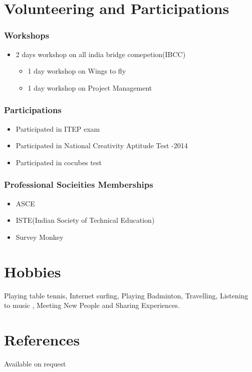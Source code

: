 \documentclass[a4paper,10pt]{article}
\begin{document}
\section{Volunteering and Participations}
\subsubsection{Workshops}
\begin{itemize}
\item 2 days workshop on all india bridge comepetion(IBCC)
\begin{itemize}
\item 1 day workshop on Wings to fly 
\item 1 day workshop on Project Management
\end{itemize}
\end{itemize}


\subsubsection{Participations}
\begin{itemize}
\item Participated in ITEP exam
\item Participated in National Creativity Aptitude Test -2014
\item Participated in cocubes test
\end{itemize}
\subsubsection{Professional Socieities Memberships}
\begin{itemize}
\item ASCE
\item ISTE(Indian Society of Technical Education)
\item Survey Monkey
\end{itemize}



\section{Hobbies}
Playing table tennis, Internet surfing, Playing Badminton, Travelling, Listening to music , Meeting New People and Sharing Experiences.\\

\section{References}
Available on request
\end{document}
